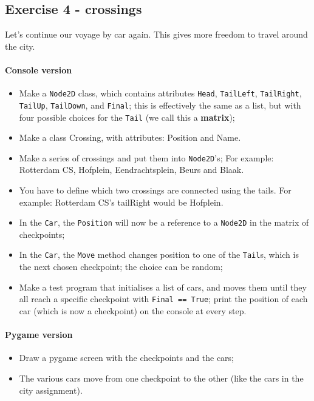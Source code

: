     \subsection{Exercise 4 - crossings}
        Let's continue our voyage by car again. This gives more freedom to travel around the city.
        \paragraph*{Console version}
        \begin{itemize}
            \item Make a \texttt{Node2D} class,
            which contains attributes
            \texttt{Head}, \texttt{TailLeft}, \texttt{TailRight}, \texttt{TailUp}, \texttt{TailDown}, and \texttt{Final};
            this is effectively the same as a list,
            but with four possible choices for the \texttt{Tail} (we call this a \textbf{matrix});
            \item Make a class Crossing, with attributes: Position and Name.
            \item Make a series of crossings and put them into \texttt{Node2D}'s; For example: Rotterdam CS, Hofplein, Eendrachtsplein, Beurs and Blaak.
            \item You have to define which two crossings are connected using the tails. For example: Rotterdam CS's tailRight would be Hofplein.
            \item In the \texttt{Car}, the \texttt{Position} will now be a reference to a \texttt{Node2D} in the matrix of checkpoints;
            \item In the \texttt{Car}, the \texttt{Move} method changes position to one of the \texttt{Tail}s, which is the next chosen checkpoint; the choice can be random;
            \item Make a test program that initialises a list of cars, and moves them until they all reach a specific checkpoint with \texttt{Final == True}; print the position of each car (which is now a checkpoint) on the console at every step.
        \end{itemize}

        \paragraph*{Pygame version}
        \begin{itemize}
            \item Draw a pygame screen with the checkpoints and the cars;
            \item The various cars move from one checkpoint to the other (like the cars in the city assignment).
        \end{itemize}

